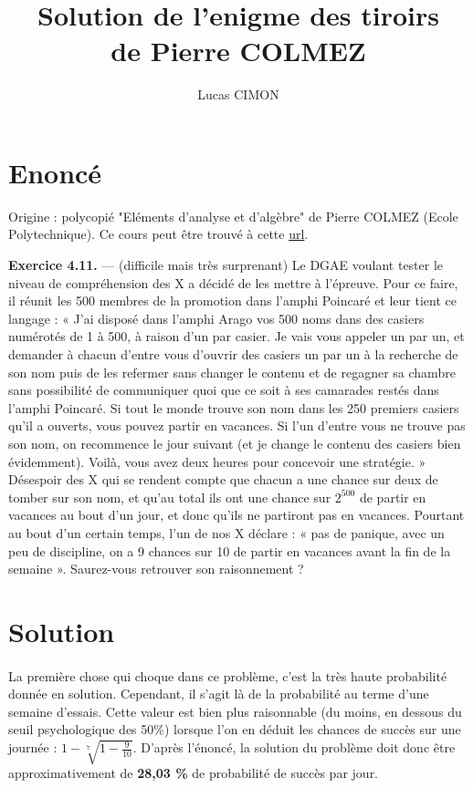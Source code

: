 \documentclass[a4paper,11pt]{article}
\title{Solution de l'enigme des tiroirs \\ de Pierre COLMEZ}
\author{Lucas CIMON}
\begin{document}

\maketitle

\section*{Enoncé}

Origine : polycopié "Eléments d'analyse et d'algèbre" de Pierre COLMEZ (Ecole Polytechnique).
Ce cours peut être trouvé à cette \href{http://people.math.jussieu.fr/~colmez/poly-07.pdf}{url}.

\textbf{Exercice 4.11.} — (difficile mais très surprenant) Le DGAE voulant tester le niveau de compréhension
des X a décidé de les mettre à l’épreuve. Pour ce faire, il réunit les 500 membres de la promotion dans
l’amphi Poincaré et leur tient ce langage : « J’ai disposé dans l’amphi Arago vos 500 noms dans des casiers
numérotés de 1 à 500, à raison d’un par casier. Je vais vous appeler un par un, et demander à chacun
d’entre vous d’ouvrir des casiers un par un à la recherche de son nom puis de les refermer sans changer
le contenu et de regagner sa chambre sans possibilité de communiquer quoi que ce soit à ses camarades
restés dans l’amphi Poincaré. Si tout le monde trouve son nom dans les 250 premiers casiers qu’il a
ouverts, vous pouvez partir en vacances. Si l’un d’entre vous ne trouve pas son nom, on recommence le
jour suivant (et je change le contenu des casiers bien évidemment). Voilà, vous avez deux heures pour
concevoir une stratégie. » Désespoir des X qui se rendent compte que chacun a une chance sur deux de
tomber sur son nom, et qu’au total ils ont une chance sur $2^{500}$ de partir en vacances au bout d’un jour,
et donc qu’ils ne partiront pas en vacances. Pourtant au bout d’un certain temps, l’un de nos X déclare :
« pas de panique, avec un peu de discipline, on a 9 chances sur 10 de partir en vacances avant la fin de
la semaine ». Saurez-vous retrouver son raisonnement ?


\newpage
\section*{Solution}

    \paragraph {}
La première chose qui choque dans ce problème, c'est la très haute probabilité donnée en solution. Cependant, il s'agit là de la probabilité au terme d'une semaine d'essais. Cette valeur est bien plus raisonnable (du moins, en dessous du seuil psychologique des 50\%) lorsque l'on en déduit les chances de succès sur une journée : $1 - \sqrt[7]{1 - \frac{9}{10}}$. D'après l'énoncé, la solution du problème doit donc être approximativement de \textbf{28,03 \%} de probabilité de succès par jour.
\end{document}
